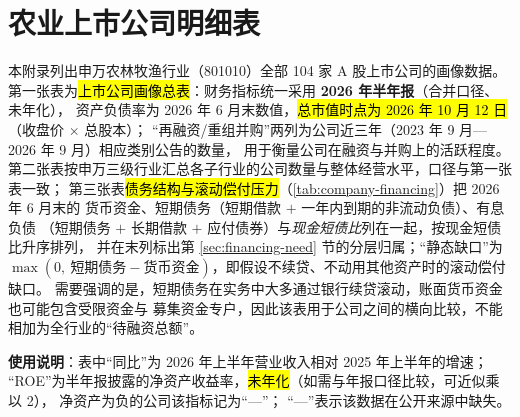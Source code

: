 \section{农业上市公司明细表}
\label{app:companies}

本附录列出申万农林牧渔行业（801010）全部 \num{104} 家 A 股上市公司的画像数据。
第一张表为\hl{上市公司画像总表}：财务指标统一采用 \textbf{2026 年半年报}（合并口径、未年化），
资产负债率为 2026 年 6 月末数值，\hl{总市值时点为 2026 年 10 月 12 日}（收盘价 $\times$ 总股本）；
“再融资/重组并购”两列为公司近三年（2023 年 9 月---2026 年 9 月）相应类别公告的数量，
用于衡量公司在融资与并购上的活跃程度。
第二张表按申万三级行业汇总各子行业的公司数量与整体经营水平，口径与第一张表一致；
第三张表\hl{债务结构与滚动偿付压力}（\ref{tab:company-financing}）把 2026 年 6 月末的
货币资金、短期债务（短期借款 $+$ 一年内到期的非流动负债）、有息负债
（短期债务 $+$ 长期借款 $+$ 应付债券）与\emph{现金短债比}列在一起，按现金短债比升序排列，
并在末列标出第 \ref{sec:financing-need} 节的分层归属；“静态缺口”为
$\max(0,\ \text{短期债务} - \text{货币资金})$，即假设不续贷、不动用其他资产时的滚动偿付缺口。
需要强调的是，短期债务在实务中大多通过银行续贷滚动，账面货币资金也可能包含受限资金与
募集资金专户，因此该表用于公司之间的横向比较，不能相加为全行业的“待融资总额”。



\vspace{10pt}


\vspace{10pt}


\vspace{10pt}
\noindent\textbf{使用说明}：表中“同比”为 2026 年上半年营业收入相对 2025 年上半年的增速；
“ROE”为半年报披露的净资产收益率，\hl{未年化}（如需与年报口径比较，可近似乘以 2），
净资产为负的公司该指标记为“—”；
“—”表示该数据在公开来源中缺失。

